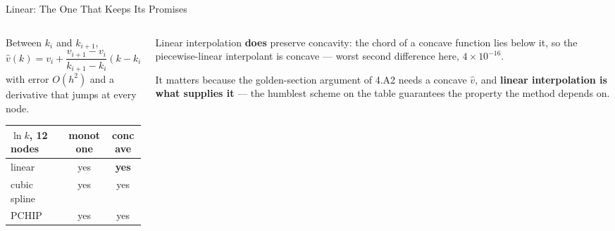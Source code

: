 \begin{frame}{Linear: The One That Keeps Its Promises}
\begin{columns}[c]
\begin{column}{0.49\textwidth}
\small
Between $k_i$ and $k_{i+1}$,
\[
  \hat v(k)=v_i+\frac{v_{i+1}-v_i}{k_{i+1}-k_i}(k-k_i),
\]
with error $O(h^{2})$ and a derivative that jumps at every node.
\medskip
\begin{center}\footnotesize
\begin{tabularx}{\linewidth}{@{}>{\raggedright\arraybackslash}X c c@{}}
\toprule
$\ln k$, 12 nodes & \textbf{monotone} & \textbf{concave} \\
\midrule
linear & yes & \textbf{yes} \\
cubic spline & yes & yes \\
PCHIP & yes & yes \\
\bottomrule
\end{tabularx}
\end{center}
\end{column}
\begin{column}{0.48\textwidth}
\begin{cautionbox}[title=\textbf{Read the concavity row}]\small
Linear interpolation \textbf{does} preserve concavity: the chord of a concave function lies below it, so the piecewise-linear interpolant is concave --- worst second difference here, $4\times10^{-16}$.
\end{cautionbox}
\medskip
\begin{takeawaybox}\footnotesize
It matters because the golden-section argument of 4.A2 needs a concave $\hat v$, and \textbf{linear interpolation is what supplies it} --- the humblest scheme on the table guarantees the property the method depends on.
\end{takeawaybox}
\end{column}
\end{columns}
\vspace{1mm}
\end{frame}

